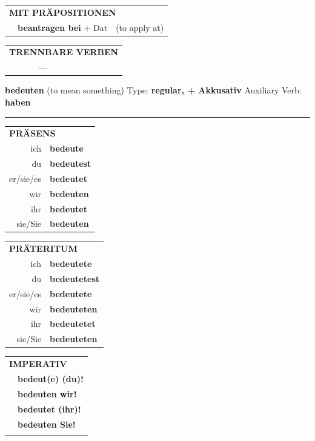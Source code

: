 \documentclass[10pt,a4paper]{revtex4-2}
\begin{document}
\begin{verbbox-acc}
\vspace{10pt}

\begin{tabular}{lll}
\multicolumn{3}{l}{\textbf{MIT PRÄPOSITIONEN}}\\
& \textbf{beantragen bei} + Dat & (to apply at)\\
\end{tabular}
\hfill
\begin{tabular}{lll}
\multicolumn{3}{l}{\textbf{TRENNBARE VERBEN}}\\
& ---\\
\end{tabular}
\vspace{-5pt}
\end{verbbox-acc}

\begin{verbbox-acc}
    {\Large \bf bedeuten} (to mean something) \hfill Type: \textbf{regular, + Akkusativ} \hfill Auxiliary Verb: \textbf{haben} 
    
     \vspace{5pt}

    \hrule
    
    \vspace{5pt}

  \begin{tabular}{rl}
     \multicolumn{2}{l}{\textbf{PRÄSENS} }\\
    ich & \textbf{bedeute}\\
    du & \textbf{bedeutest}\\
    er/sie/es & \textbf{bedeutet}\\
    wir & \textbf{bedeuten}\\
    ihr & \textbf{bedeutet}\\
    sie/Sie & \textbf{bedeuten}\\
  \end{tabular}
  \hfill
     \begin{tabular}{rl}
    \multicolumn{2}{l}{\textbf{PRÄTERITUM} }\\
    ich & \textbf{bedeutete}\\
    du & \textbf{bedeutetest}\\
    er/sie/es & \textbf{bedeutete}\\
    wir & \textbf{bedeuteten}\\
    ihr & \textbf{bedeutetet}\\
    sie/Sie & \textbf{bedeuteten}\\
  \end{tabular}
  \hfill
  \begin{tabular}{rl}
     \multicolumn{2}{l}{\textbf{IMPERATIV} }\\
   & \textbf{bedeut(e) (du)!}\\
   & \textbf{bedeuten wir!}\\
   & \textbf{bedeutet (ihr)!}\\
   & \textbf{bedeuten Sie!}\\
   & \vspace{10pt}
  \end{tabular}


\end{verbbox-acc}
\end{document}
